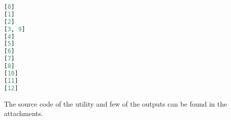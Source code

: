 \begin{lstlisting}[caption={Found patterns on disk with two same chunks},label={fig:rng_pattern_fig_some},language=Python]
[0]
[1]
[2]
[3, 9]
[4]
[5]
[6]
[7]
[8]
[10]
[11]
[12]
\end{lstlisting}


The source code of the utility and few of the outputs can be found in the attachments.


